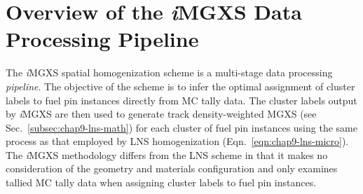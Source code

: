 %
%


\section{Overview of the \textit{i}MGXS Data Processing Pipeline}
\label{sec:chap10-overview}

The \textit{i}\ac{MGXS} spatial homogenization scheme is a multi-stage data processing \textit{pipeline}. The objective of the scheme is to infer the optimal assignment of cluster labels to fuel pin instances directly from \ac{MC} tally data. The cluster labels output by \textit{i}\ac{MGXS} are then used to generate track density-weighted \ac{MGXS} (see Sec.~\ref{subsec:chap9-lns-math}) for each cluster of fuel pin instances using the same process as that employed by \ac{LNS} homogenization (Eqn.~\ref{eqn:chap9-lns-micro}). The \textit{i}\ac{MGXS} methodology differs from the \ac{LNS} scheme in that it makes no consideration of the geometry and materials configuration and only examines tallied \ac{MC} tally data when assigning cluster labels to fuel pin instances.

